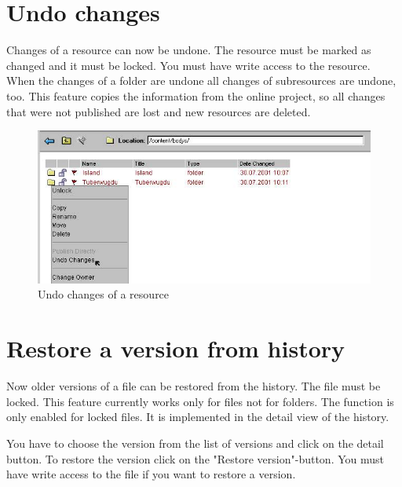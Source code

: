 \newpage
\section{Undo changes}

Changes of a resource can now be undone. The resource must be
marked as changed and it must be locked. You must have write
access to the resource. When the changes of a folder are undone
all changes of subresources are undone, too. This feature copies
the information from the online project, so all changes that were
not published are lost and new resources are deleted.

\begin{figure}[hbt]
\begin{center}
\includegraphics[width=\sgw]
                   {pics/newProject/undo01}
\caption[Undo changes of a resource]
           {Undo changes of a resource}
\label{undo}
\end{center}
\end{figure}


\newpage
\section{Restore a version from history}

Now older versions of a file can be restored from the history. The
file must be locked. This feature currently works only for files
not for folders. The function is only enabled for locked files. It
is implemented in the detail view of the history.

You have to choose the version from the list of versions and click
on the detail button. To restore the version click on the "Restore
version"-button. You must have write access to the file if you
want to restore a version.

